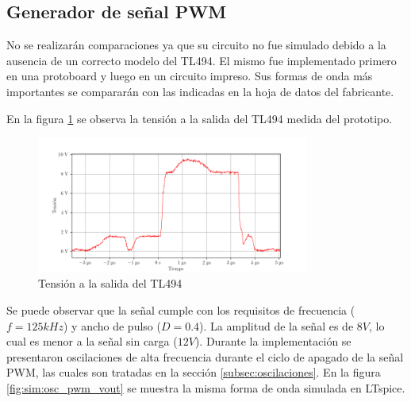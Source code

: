 
\subsection{Generador de señal PWM}

No se realizarán comparaciones ya que su circuito no fue simulado debido a la ausencia de un correcto modelo del TL494.
El mismo fue implementado primero en una protoboard y luego en un circuito impreso.
Sus formas de onda más importantes se compararán con las indicadas en la hoja de datos del fabricante.

En la figura \ref{fig:osc_pwm_vout_disconnected} se observa la tensión a la salida del TL494 medida del prototipo.

\begin{figure}[H]
    \centering
    \includegraphics[width=0.8\textwidth]{images/capturas-osciloscopio/17-11-2022/1.png}
    \caption{Tensión a la salida del TL494}
    \label{fig:osc_pwm_vout_disconnected}
\end{figure}

Se puede observar que la señal cumple con los requisitos de frecuencia ($f=125kHz$) y ancho de pulso ($D=0.4$).
La amplitud de la señal es de $8V$, lo cual es menor a la señal sin carga ($12V$).
Durante la implementación se presentaron oscilaciones de alta frecuencia durante el ciclo de apagado de la señal PWM, las cuales son tratadas en la sección \ref{subsec:oscilaciones}.
En la figura \ref{fig:sim:osc_pwm_vout} se muestra la misma forma de onda simulada en LTspice.

